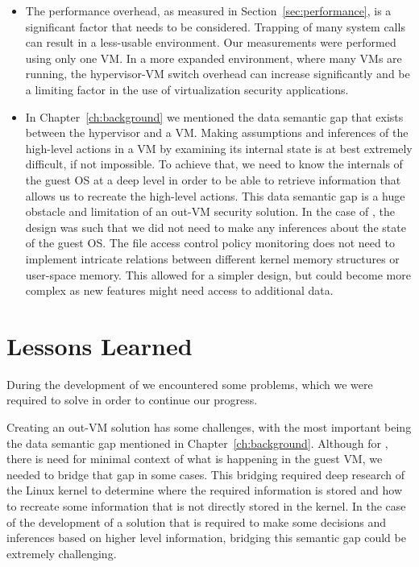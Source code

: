\begin{itemize}
\item The performance overhead, as measured in Section~\ref{sec:performance}, is a significant factor that needs to be considered. Trapping of many system calls can result in a less-usable environment. Our measurements were performed using only one \ac{VM}. In a more expanded environment, where many \acp{VM} are running, the hypervisor-\ac{VM} switch overhead can increase significantly and be a limiting factor in the use of virtualization security applications.

\item In Chapter~\ref{ch:background} we mentioned the data semantic gap that exists between the hypervisor and a \ac{VM}. Making assumptions and inferences of the high-level actions in a \ac{VM} by examining its internal state is at best extremely difficult, if not impossible. To achieve that, we need to know the internals of the guest \ac{OS} at a deep level in order to be able to retrieve information that allows us to recreate the high-level actions. This data semantic gap is a huge obstacle and limitation of an out-\ac{VM} security solution. In the case of , the design was such that we did not need to make any inferences about the state of the guest \ac{OS}. The file access control policy monitoring does not need to implement intricate relations between different kernel memory structures or user-space memory. This allowed for a simpler design, but could become more complex as new features might need access to additional data.
 
\end{itemize} 


\section{Lessons Learned}

\par During the development of  we encountered some problems, which we were required to solve in order to continue our progress.  

\par Creating an out-\ac{VM} solution has some challenges, with the most important being the data semantic gap mentioned in Chapter~\ref{ch:background}. Although for , there is need for minimal context of what is happening in the guest \ac{VM}, we needed to bridge that gap in some cases. This bridging required deep research of the Linux kernel to determine where the required information is stored and how to recreate some information that is not directly stored in the kernel. In the case of the development of a solution that is required to make some decisions and inferences based on higher level information, bridging this semantic gap could be extremely challenging.

